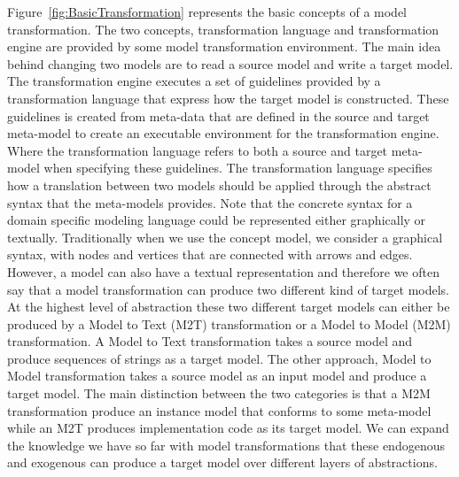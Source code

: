 Figure~\ref{fig:BasicTransformation} represents the basic concepts
of a model transformation. The two concepts, transformation language and
transformation engine are provided by some model transformation environment.
The main idea behind changing two models are to read a source model and write a
target model. The transformation engine executes a set of guidelines
provided by a transformation language that express how the target model is
constructed. These guidelines is created from meta-data that are defined in the
source and target meta-model to create an executable environment for the transformation
engine. Where the transformation language refers to both a source and target
meta-model when specifying these guidelines. The transformation language
specifies how a translation between two models should be applied through the
abstract syntax that the meta-models provides. Note that the concrete syntax
for a domain specific modeling language could be represented either graphically
or textually. Traditionally when we use the concept model, we consider a
graphical syntax, with nodes and vertices that are connected with arrows and
edges. However, a model can also have a textual representation and therefore we
often say that a model transformation can produce two different kind of target
models. At the highest level of abstraction these two different target models
can either be produced by a Model to Text (M2T) transformation or a Model to
Model (M2M) transformation. A Model to Text transformation takes a source model
and produce sequences of strings as a target model. The other approach, Model to
Model transformation takes a source model as an input model and produce a
target model. The main distinction between the two categories is that a M2M
transformation produce an instance model that conforms to some meta-model while
an M2T produces implementation code as its target model. We can expand the
knowledge we have so far with model transformations that these endogenous and
exogenous can produce a target model over different layers of abstractions.




